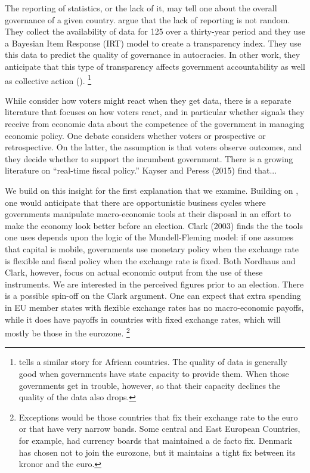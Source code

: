 \documentclass[]{article}
\begin{document}
The reporting of statistics, or the lack of it,  may tell one about the overall governance of a given country. \cite{Hollyer2014} argue that the lack of reporting is not random. They collect the availability of data for 125 over a thirty-year period and they use a Bayesian Item Response  (IRT) model to create a transparency index.  They use this data to predict the quality of governance in autocracies. In other work, they anticipate that this type of transparency affects government accountability as well as collective action (\cite{Hollyer2016}). \footnote{\cite{Jervin:2013} tells a similar story for African countries. The quality of data is generally good when governments have state capacity to provide them. When those governments get in trouble, however, so that their capacity declines the quality of the data also drops.}

While \cite{Hollyer2014} consider how voters might react when they get data, there is a separate literature that focuses on how voters react, and in particular whether signals they receive from economic data about the competence of the government in managing economic policy. One debate considers whether voters or prospective or retrospective. On the latter, the assumption is that voters observe outcomes, and they decide whether to support the incumbent government. There is a growing literature on “real-time fiscal policy.” Kayser and Peress (2015) find that...

We build on this insight for the first explanation that we examine. Building on \cite{Nordhaus1975}, one would anticipate that there are opportunistic business cycles where governments manipulate macro-economic tools at their disposal in an effort to make the economy look better before an election. Clark (2003) finds the the tools one uses depends upon the logic of the Mundell-Fleming model: if one assumes that capital is mobile, governments use monetary policy when the exchange rate is flexible and fiscal policy when the exchange rate is fixed. Both Nordhaus and Clark, however, focus on actual economic output from the use of these instruments. We are interested in the perceived figures prior to an election. There is  a possible spin-off on the Clark argument. One can expect that extra spending in EU member states with flexible exchange rates has no macro-economic payoffs, while it does have payoffs in countries with fixed exchange rates, which will mostly be those in the eurozone. \footnote{Exceptions would be those countries that fix their exchange rate to the euro or that have very narrow bands. Some central and East European Countries, for example, had currency boards that maintained a de facto fix. Denmark has chosen not to join the eurozone, but it maintains a tight fix between its kronor and the euro.}
\end{document}
